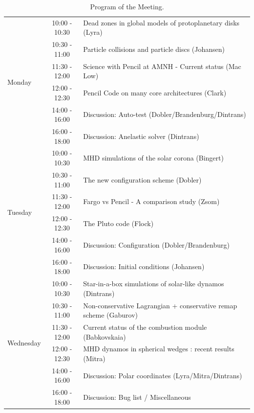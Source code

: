 \documentclass{article}
\begin{document}
\begin{table}
\caption[]{Program of the Meeting.}
\label{tab:program}
\begin{center}
\begin{tabular}{|l||cl|}\hline
\multirow{6}{*}{Monday}   &10:00 - 10:30&Dead zones in global models of protoplanetary disks (Lyra)\\
                          &10:30 - 11:00&Particle collisions and particle discs (Johansen)\\
                          &11:30 - 12:00&Science with Pencil at AMNH - Current status (Mac Low)\\
                          &12:00 - 12:30&{\sc Pencil Code} on many core architectures (Clark)\\
                          &14:00 - 16:00&Discussion: Auto-test (Dobler/Brandenburg/Dintrans)\\
                          &16:00 - 18:00&Discussion: Anelastic solver (Dintrans)\\\hline
%
\multirow{6}{*}{Tuesday}  &10:00 - 10:30&MHD simulations of the solar corona (Bingert)\\
                          &10:30 - 11:00&The new configuration scheme (Dobler)\\
                          &11:30 - 12:00&Fargo vs Pencil - A comparison study (Zsom)\\
                          &12:00 - 12:30&The Pluto code (Flock)\\
                          &14:00 - 16:00&Discussion: Configuration (Dobler/Brandenburg)\\
                          &16:00 - 18:00&Discussion: Initial conditions (Johansen)\\\hline
%
\multirow{6}{*}{Wednesday}&10:00 - 10:30&Star-in-a-box simulations of solar-like dynamos (Dintrans)\\
                          &10:30 - 11:00&Non-conservative Lagrangian + conservative remap scheme (Gaburov)\\
                          &11:30 - 12:00&Current status of the combustion module (Babkovskaia)\\
                          &12:00 - 12:30&MHD dynamos in spherical wedges : recent results (Mitra)\\
                          &14:00 - 16:00&Discussion: Polar coordinates (Lyra/Mitra/Dintrans)\\
                          &16:00 - 18:00&Discussion: Bug list / Miscellaneous\\\hline

\end{tabular}
\end{center}
\end{table}
\end{document}
